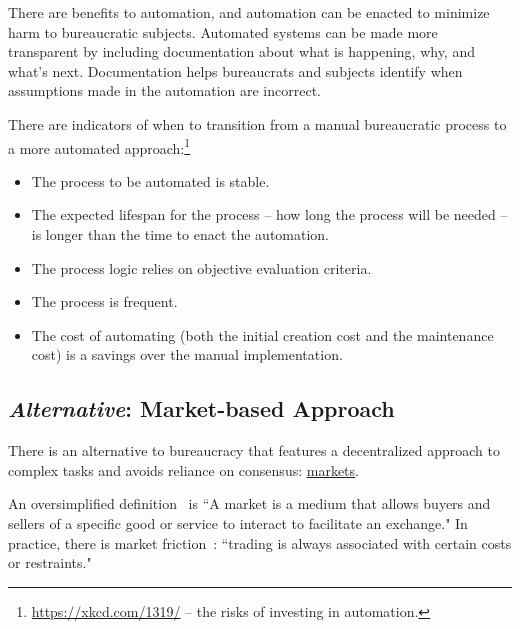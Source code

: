 There are benefits to automation, and automation can be enacted to minimize harm to bureaucratic subjects. Automated systems can be made more transparent by including documentation about what is happening, why, and what's next.
%
%
Documentation helps  bureaucrats and subjects identify when assumptions made in the automation are incorrect. 


There are indicators of when to transition from a manual bureaucratic process to a more automated approach:\footnote{\href{https://xkcd.com/1319/}{https://xkcd.com/1319/} -- the risks of investing in automation.}
\begin{itemize}
    \item The process to be automated is stable.
    \item The expected lifespan for the process -- how long the process will be needed -- is  longer than the time to enact the automation.
\item The process logic relies on objective evaluation criteria.  
\item The process is frequent.
\item The cost of automating (both the initial creation cost and the maintenance cost) is a savings over the manual implementation.
\end{itemize}


\subsection*{\textit{Alternative}: Market-based Approach}

There is an alternative to bureaucracy that features a decentralized approach to complex tasks and avoids reliance on consensus: \href{https://en.wikipedia.org/wiki/Market_(economics)}{markets}.

An oversimplified definition~\cite{2023_Kenton} is ``A market is a medium that allows buyers and sellers of a specific good or service to interact to facilitate an exchange." 
In practice, there is market friction~\cite{2021_Downey, 2011_Matouschek}: ``trading is always associated with certain costs or restraints."

